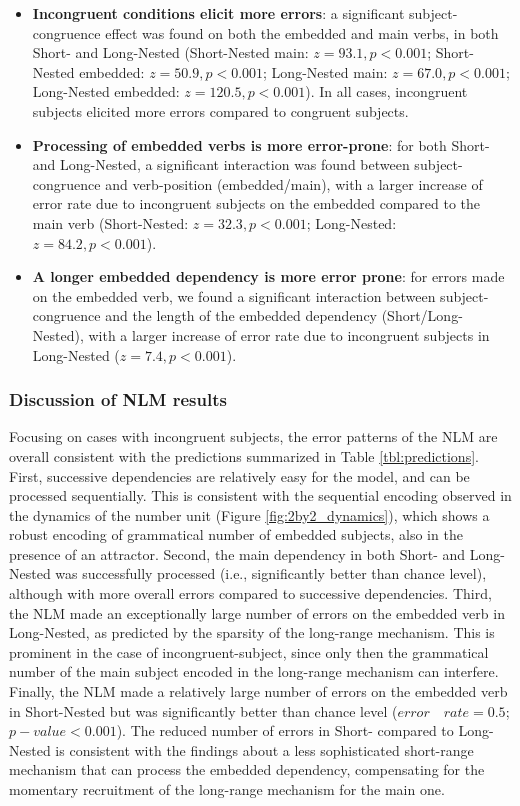 \begin{itemize}
    \item \textbf{Incongruent conditions elicit more errors}: a significant subject-congruence effect was found on both the embedded and main verbs, in both Short- and Long-Nested (Short-Nested main: $z=93.1, p<0.001$; Short-Nested embedded: $z=50.9, p<0.001$; Long-Nested main: $z=67.0, p<0.001$; Long-Nested embedded: $z=120.5, p<0.001$). In all cases, incongruent subjects elicited more errors compared to congruent subjects.
    \item \textbf{Processing of embedded verbs is more error-prone}: for both Short- and Long-Nested, a significant interaction was found between subject-congruence and verb-position (embedded/main), with a larger increase of error rate due to incongruent subjects on the embedded compared to the main verb (Short-Nested: $z=32.3, p<0.001$; Long-Nested: $z=84.2, p<0.001$).
    \item \textbf{A longer embedded dependency is more error prone}: for errors made on the embedded verb, we found a significant interaction between subject-congruence and the length of the embedded dependency (Short/Long-Nested), with a larger increase of error rate due to incongruent subjects in Long-Nested ($z=7.4, p<0.001$).
\end{itemize}
 
\vspace{10pt}

\subsubsection{Discussion of NLM results}
Focusing on cases with incongruent subjects, the error patterns of the NLM are overall consistent with the predictions summarized in Table \ref{tbl:predictions}. First, successive dependencies are relatively easy for the model, and can be processed sequentially. This is consistent with the sequential encoding observed in the dynamics of the number unit (Figure \ref{fig:2by2_dynamics}), which shows a robust encoding of grammatical number of embedded subjects, also in the presence of an attractor. Second, the main dependency in both Short- and Long-Nested was successfully processed (i.e., significantly better than chance level), although with more overall errors compared to successive dependencies. Third, the NLM made an exceptionally large number of errors on the embedded verb in Long-Nested, as predicted by the sparsity of the long-range mechanism. This is prominent in the case of incongruent-subject, since only then the grammatical number of the main subject encoded in the long-range mechanism can interfere. Finally, the NLM made a relatively large number of errors on the embedded verb in Short-Nested but was significantly better than chance level ($error \quad rate = 0.5$; $p-value < 0.001$). The reduced number of errors in Short- compared to Long-Nested is consistent with the findings about a less sophisticated short-range mechanism that can process the embedded dependency, compensating for the momentary recruitment of the long-range mechanism for the main one. 

